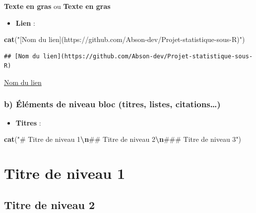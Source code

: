 \documentclass[
]{article}
\newenvironment{Shaded}{\begin{snugshade}}{\end{snugshade}}
\newcommand{\FunctionTok}[1]{\textcolor[rgb]{0.13,0.29,0.53}{\textbf{#1}}}
\newcommand{\NormalTok}[1]{#1}
\newcommand{\SpecialCharTok}[1]{\textcolor[rgb]{0.81,0.36,0.00}{\textbf{#1}}}
\newcommand{\StringTok}[1]{\textcolor[rgb]{0.31,0.60,0.02}{#1}}
\providecommand{\tightlist}{%
  \setlength{\itemsep}{0pt}\setlength{\parskip}{0pt}}
\begin{document}
\textbf{Texte en gras} ou \textbf{Texte en gras}

\begin{itemize}
\tightlist
\item
  \textbf{Lien} :
\end{itemize}

\begin{Shaded}
\begin{Highlighting}[]
\FunctionTok{cat}\NormalTok{(}\StringTok{"[Nom du lien](https://github.com/Abson{-}dev/Projet{-}statistique{-}sous{-}R)"}\NormalTok{)}
\end{Highlighting}
\end{Shaded}

\begin{verbatim}
## [Nom du lien](https://github.com/Abson-dev/Projet-statistique-sous-R)
\end{verbatim}

\href{https://github.com/Abson-dev/Projet-statistique-sous-R}{Nom du
lien}

\hypertarget{b-uxe9luxe9ments-de-niveau-bloc-titres-listes-citations}{%
\subsubsection{b) Éléments de niveau bloc (titres, listes,
citations\ldots)}\label{b-uxe9luxe9ments-de-niveau-bloc-titres-listes-citations}}

\begin{itemize}
\tightlist
\item
  \textbf{Titres} :
\end{itemize}

\begin{Shaded}
\begin{Highlighting}[]
\FunctionTok{cat}\NormalTok{(}\StringTok{"\# Titre de niveau 1}\SpecialCharTok{\textbackslash{}n}\StringTok{\#\# Titre de niveau 2}\SpecialCharTok{\textbackslash{}n}\StringTok{\#\#\# Titre de niveau 3"}\NormalTok{)}
\end{Highlighting}
\end{Shaded}

\hypertarget{titre-de-niveau-1}{%
\section{Titre de niveau 1}\label{titre-de-niveau-1}}

\hypertarget{titre-de-niveau-2}{%
\subsection{Titre de niveau 2}\label{titre-de-niveau-2}}
\end{document}
